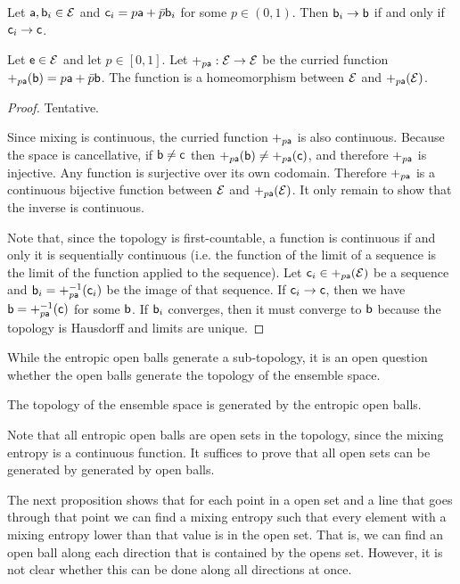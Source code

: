\begin{conj}
	Let $\ens[a], \ens[b]_i\in \Ens$ and $\ens[c]_i = p \ens[a] +\bar{p} \ens[b]_i$ for some $p \in (0,1)$. Then $\ens[b]_i \to \ens[b]$ if and only if $\ens[c]_i \to \ens[c]$. 
\end{conj}

\begin{conj}
	Let $\ens \in \Ens$ and let $p \in [0,1]$. Let $+_{p\ens[a]} : \Ens \to \Ens$ be the curried function $+_{p\ens[a]}(\ens[b]) = p\ens[a] + \bar{p}\ens[b]$. The function is a homeomorphism between $\Ens$ and $+_{p\ens[a]}(\Ens)$.
\end{conj}

\begin{proof}
	Tentative.
	
	Since mixing is continuous, the curried function $+_{p\ens[a]}$ is also continuous. Because the space is cancellative, if $\ens[b] \neq \ens[c]$ then $+_{p\ens[a]}(\ens[b]) \neq +_{p\ens[a]}(\ens[c])$, and therefore $+_{p\ens[a]}$ is injective. Any function is surjective over its own codomain. Therefore $+_{p\ens[a]}$ is a continuous bijective function between $\Ens$ and $+_{p\ens[a]}(\Ens)$. It only remain to show that the inverse is continuous.
	
	Note that, since the topology is first-countable, a function is continuous if and only it is sequentially continuous (i.e. the function of the limit of a sequence is the limit of the function applied to the sequence). Let $\ens[c]_i \in +_{p\ens[a]}(\Ens)$ be a sequence and $\ens[b]_i = +_{p\ens[a]}^{-1}(\ens[c]_i)$ be the image of that sequence. If $\ens[c]_i \to \ens[c]$, then we have $\ens[b] = +_{p\ens[a]}^{-1}(\ens[c])$ for some $\ens[b]$. If $\ens[b]_i$ converges, then it must converge to $\ens[b]$ because the topology is Hausdorff and limits are unique.
\end{proof}

While the entropic open balls generate a sub-topology, it is an open question whether the open balls generate the topology of the ensemble space.

\begin{conj}
	The topology of the ensemble space is generated by the entropic open balls.
\end{conj}

\begin{remark}
	Note that all entropic open balls are open sets in the topology, since the mixing entropy is a continuous function. It suffices to prove that all open sets can be generated by generated by open balls.
	
	The next proposition shows that for each point in a open set and a line that goes through that point we can find a mixing entropy such that every element with a mixing entropy lower than that value is in the open set. That is, we can find an open ball along each direction that is contained by the opens set. However, it is not clear whether this can be done along all directions at once.
\end{remark}

